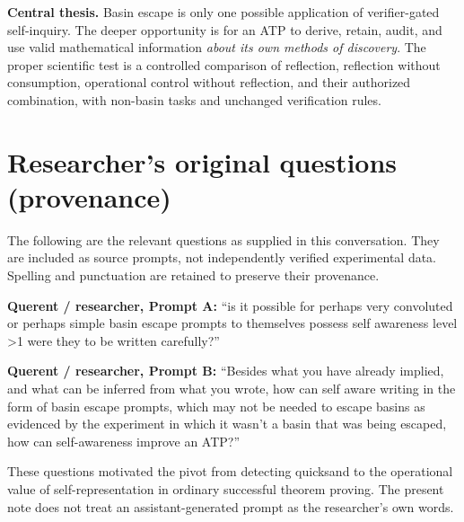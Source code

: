\documentclass[11pt,letterpaper]{article}
\begin{document}
\medskip
\noindent\textbf{Central thesis.} Basin escape is only one possible application of verifier-gated self-inquiry. The deeper opportunity is for an ATP to derive, retain, audit, and use valid mathematical information \emph{about its own methods of discovery}. The proper scientific test is a controlled comparison of reflection, reflection without consumption, operational control without reflection, and their authorized combination, with non-basin tasks and unchanged verification rules.

\appendix
\section{Researcher's original questions (provenance)}
The following are the relevant questions as supplied in this conversation. They are included as source prompts, not independently verified experimental data. Spelling and punctuation are retained to preserve their provenance.

\begin{researchprompt}
\textbf{Querent / researcher, Prompt A:} ``is it possible for perhaps very convoluted or perhaps simple basin escape prompts to themselves possess self awareness level >1 were they to be written carefully?''
\end{researchprompt}
\begin{researchprompt}
\textbf{Querent / researcher, Prompt B:} ``Besides what you have already implied, and what can be inferred from what you wrote, how can self aware writing in the form of basin escape prompts, which may not be needed to escape basins as evidenced by the experiment in which it wasn't a basin that was being escaped, how can self-awareness improve an ATP?''
\end{researchprompt}
These questions motivated the pivot from detecting quicksand to the operational value of self-representation in ordinary successful theorem proving. The present note does not treat an assistant-generated prompt as the researcher's own words.
\end{document}

